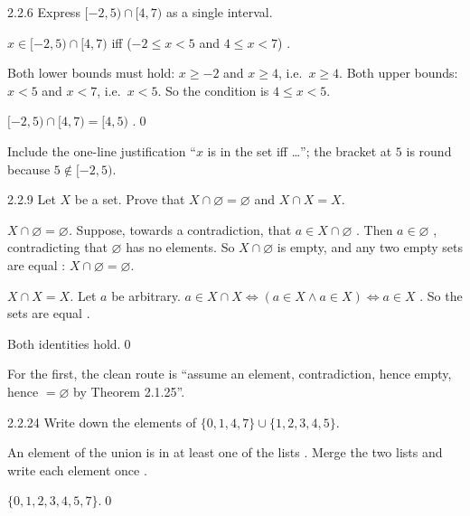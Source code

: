 \begin{bookex}[recommended]{2.2.6}
Express $[-2,5)\cap[4,7)$ as a single interval.
\solution
\begin{steps}
\item $x\in[-2,5)\cap[4,7)$ iff ($-2\le x<5$ and $4\le x<7$) .
\item Both lower bounds must hold: $x\ge-2$ and $x\ge4$, i.e.\ $x\ge4$. Both upper bounds: $x<5$ and $x<7$, i.e.\ $x<5$. So the condition is $4\le x<5$.
\end{steps}
\answer $[-2,5)\cap[4,7)=[4,5)$ .\qed
\begin{compare}
\item Include the one-line justification ``$x$ is in the set iff \dots''; the bracket at $5$ is round because $5\notin[-2,5)$.
\end{compare}
\end{bookex}

\begin{bookex}[recommended]{2.2.9}
Let $X$ be a set. Prove that $X\cap\varnothing=\varnothing$ and $X\cap X=X$.
\solution
\begin{steps}
\item \emph{$X\cap\varnothing=\varnothing$.} Suppose, towards a contradiction, that $a\in X\cap\varnothing$ . Then $a\in\varnothing$ , contradicting that $\varnothing$ has no elements. So $X\cap\varnothing$ is empty, and any two empty sets are equal : $X\cap\varnothing=\varnothing$.
\item \emph{$X\cap X=X$.} Let $a$ be arbitrary. $a\in X\cap X\Leftrightarrow(a\in X\wedge a\in X)\Leftrightarrow a\in X$ . So the sets are equal .
\end{steps}
\conclusion Both identities hold.\qed
\begin{compare}
\item For the first, the clean route is ``assume an element, contradiction, hence empty, hence $=\varnothing$ by Theorem 2.1.25''.
\end{compare}
\end{bookex}

\begin{bookex}[essential]{2.2.24}
Write down the elements of $\{0,1,4,7\}\cup\{1,2,3,4,5\}$.
\solution
\begin{steps}
\item An element of the union is in at least one of the lists . Merge the two lists and write each element once .
\end{steps}
\answer $\{0,1,2,3,4,5,7\}$.\qed
\end{bookex}

